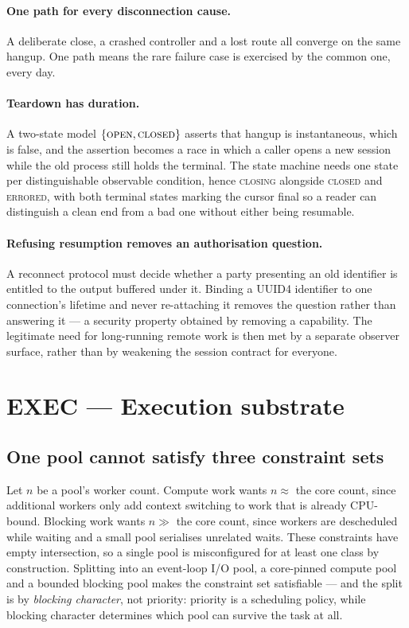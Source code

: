 \documentclass[11pt]{article}
\begin{document}
\paragraph{One path for every disconnection cause.} A deliberate close, a
crashed controller and a lost route all converge on the same hangup. One path
means the rare failure case is exercised by the common one, every day.

\paragraph{Teardown has duration.} A two-state model $\{\textsc{open},
\textsc{closed}\}$ asserts that hangup is instantaneous, which is false, and
the assertion becomes a race in which a caller opens a new session while the
old process still holds the terminal. The state machine needs one state per
distinguishable observable condition, hence \textsc{closing} alongside
\textsc{closed} and \textsc{errored}, with both terminal states marking the
cursor final so a reader can distinguish a clean end from a bad one without
either being resumable.

\paragraph{Refusing resumption removes an authorisation question.} A reconnect
protocol must decide whether a party presenting an old identifier is entitled
to the output buffered under it. Binding a UUID4 identifier to one connection's
lifetime and never re-attaching it removes the question rather than answering
it --- a security property obtained by removing a capability. The legitimate
need for long-running remote work is then met by a separate observer surface,
rather than by weakening the session contract for everyone.

\section{EXEC --- Execution substrate}

\subsection{One pool cannot satisfy three constraint sets}
\label{lbl:HS-EXEC-01}

Let $n$ be a pool's worker count. Compute work wants $n \approx$ the core count,
since additional workers only add context switching to work that is already
CPU-bound. Blocking work wants $n \gg$ the core count, since workers are
descheduled while waiting and a small pool serialises unrelated waits. These
constraints have empty intersection, so a single pool is misconfigured for at
least one class by construction. Splitting into an event-loop I/O pool, a
core-pinned compute pool and a bounded blocking pool makes the constraint set
satisfiable --- and the split is by \emph{blocking character}, not priority:
priority is a scheduling policy, while blocking character determines which pool
can survive the task at all.
\end{document}
